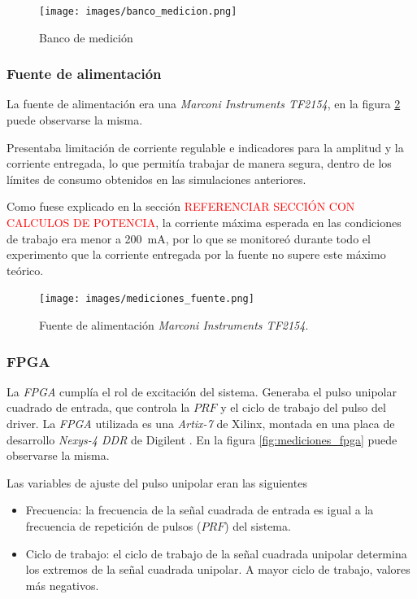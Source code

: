 \begin{figure}
  \centering
    \texttt{[image: images/banco\_medicion.png]}
    \caption{Banco de medición}
    \label{fig:banco_medicion}
\end{figure}

\subsubsection{Fuente de alimentación}

La fuente de alimentación era una \textit{Marconi Instruments TF2154}, en la figura 
\ref{fig:mediciones_fuente} puede observarse la misma.

Presentaba limitación de corriente regulable e indicadores para la amplitud y la
corriente entregada, lo que permitía trabajar de manera segura, dentro de los
límites de consumo obtenidos en las simulaciones anteriores.

Como fuese explicado en la sección \textcolor{red}{REFERENCIAR SECCIÓN CON CALCULOS DE POTENCIA},
la corriente máxima esperada en las condiciones de trabajo era menor a \qty{200}{\milli\ampere},
por lo que se monitoreó durante todo el experimento que la corriente entregada por la fuente
no supere este máximo teórico.

\begin{figure}
  \centering
    \texttt{[image: images/mediciones\_fuente.png]}
    \caption{Fuente de alimentación \textit{Marconi Instruments TF2154}.}
    \label{fig:mediciones_fuente}
\end{figure}


\subsubsection{FPGA}

La \textit{FPGA} cumplía el rol de excitación del sistema. Generaba el pulso
unipolar cuadrado de entrada, que controla la $PRF$ y el ciclo de trabajo del 
pulso del driver. La \textit{FPGA} utilizada es una \textit{Artix-7} de Xilinx,
montada en una placa de desarrollo \textit{Nexys-4 DDR} de Digilent
\cite{digilent_nexys4ddr}. En la figura
\ref{fig:mediciones_fpga} puede observarse la misma. 

Las variables de ajuste del pulso unipolar eran las siguientes

\begin{itemize}
  \item Frecuencia: la frecuencia de la señal cuadrada de entrada es igual a la
    frecuencia de repetición de pulsos ($PRF$) del sistema. 
  \item Ciclo de trabajo: el ciclo de trabajo de la señal cuadrada unipolar
    determina los extremos de la señal cuadrada unipolar. A mayor ciclo de
    trabajo, valores más negativos.
\end{itemize}

